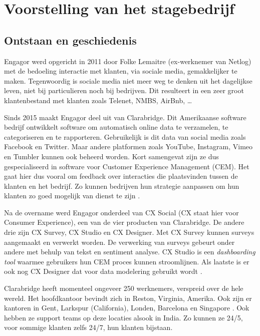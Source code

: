 \chapter{Voorstelling van het stagebedrijf}
\vspace{-3cm}
\section{Ontstaan en geschiedenis}

Engagor werd opgericht in 2011 door Folke Lemaitre (ex-werknemer van Netlog) met de bedoeling interactie met klanten, via sociale media, gemakkelijker te maken. Tegenwoordig is sociale media niet meer weg te denken uit het dagelijkse leven, niet bij particulieren noch bij bedrijven. Dit resulteert in een zeer groot klantenbestand met klanten zoals Telenet, NMBS, AirBnb, \ldots 

Sinds 2015 maakt Engagor deel uit van Clarabridge. Dit Amerikaanse software bedrijf ontwikkelt software om automatisch online data te verzamelen, te categoriseren en te rapporteren. Gebruikelijk is dit data van social media zoals Facebook en Twitter. Maar andere platformen zoals YouTube, Instagram, Vimeo en Tumbler kunnen ook beheerd worden. Kort samengevat zijn ze dus gespecialiseerd in software voor Customer Experience Management (CEM). Het gaat hier dus vooral om feedback over interacties die plaatsvinden tussen de klanten en het bedrijf. Zo kunnen bedrijven hun strategie aanpassen om hun klanten zo goed mogelijk van dienst te zijn \cite{bp1}.  

Na de overname werd Engagor onderdeel van CX Social (CX staat hier voor Consumer Experience), een van de vier producten van Clarabridge. De andere drie zijn CX Survey, CX Studio en CX Designer. Met CX Survey kunnen surveys aangemaakt en verwerkt worden. De verwerking van surveys gebeurt onder andere met behulp van tekst en sentiment analyse. CX Studio is een \textit{dashboarding tool} waarmee gebruikers hun CEM proces kunnen stroomlijnen. Als laatste is er ook nog CX Designer dat voor data modelering gebruikt wordt \cite{Clarabridge.com}. 

Clarabridge heeft momenteel ongeveer 250 werknemers, verspreid over de hele wereld. Het hoofdkantoor bevindt zich in Reston, Virginia, Amerika. Ook zijn er kantoren in Gent, Larkspur (California), Londen, Barcelona en Singapore \cite{ClarabridgeOffices}. Ook hebben ze support teams op deze locaties alsook in India. Zo kunnen ze 24/5, voor sommige klanten zelfs 24/7, hun klanten bijstaan.

